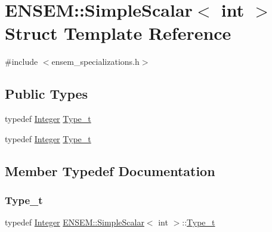\hypertarget{structENSEM_1_1SimpleScalar_3_01int_01_4}{}\section{E\+N\+S\+EM\+:\+:Simple\+Scalar$<$ int $>$ Struct Template Reference}
\label{structENSEM_1_1SimpleScalar_3_01int_01_4}


{\ttfamily \#include $<$ensem\+\_\+specializations.\+h$>$}

\subsection*{Public Types}
\begin{DoxyCompactItemize}
\item 
typedef \mbox{\hyperlink{group__defs_gab13d060149cdd80ab40fd8d653f60117}{Integer}} \mbox{\hyperlink{structENSEM_1_1SimpleScalar_3_01int_01_4_a3d6a45a8cd225aba61dd4c2593501d66}{Type\+\_\+t}}
\item 
typedef \mbox{\hyperlink{group__defs_gab13d060149cdd80ab40fd8d653f60117}{Integer}} \mbox{\hyperlink{structENSEM_1_1SimpleScalar_3_01int_01_4_a3d6a45a8cd225aba61dd4c2593501d66}{Type\+\_\+t}}
\end{DoxyCompactItemize}


\subsection{Member Typedef Documentation}
\mbox{\label{structENSEM_1_1SimpleScalar_3_01int_01_4_a3d6a45a8cd225aba61dd4c2593501d66}} 
\subsubsection{\texorpdfstring{Type\_t}{Type\_t}\hspace{0.1cm}{\footnotesize\ttfamily [1/2]}}
{\footnotesize\ttfamily typedef \mbox{\hyperlink{group__defs_gab13d060149cdd80ab40fd8d653f60117}{Integer}} \mbox{\hyperlink{structENSEM_1_1SimpleScalar}{E\+N\+S\+E\+M\+::\+Simple\+Scalar}}$<$ int $>$\+::\mbox{\hyperlink{structENSEM_1_1SimpleScalar_3_01int_01_4_a3d6a45a8cd225aba61dd4c2593501d66}{Type\+\_\+t}}}

\mbox{\label{structENSEM_1_1SimpleScalar_3_01int_01_4_a3d6a45a8cd225aba61dd4c2593501d66}} 
